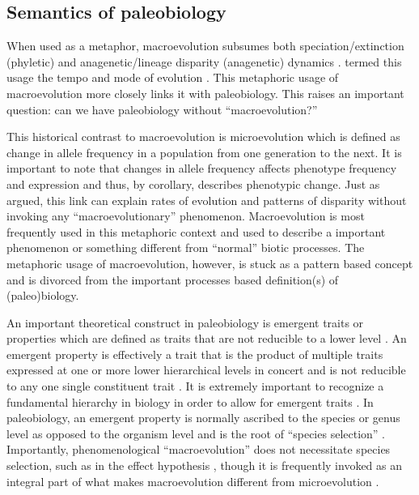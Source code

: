 \documentclass[12pt,letterpaper]{article}
\begin{document}
\subsection{Semantics of paleobiology}
When used as a metaphor, macroevolution subsumes both speciation/extinction (phyletic) and anagenetic/lineage disparity (anagenetic) dynamics \citep{Foote2007b}. \citet{Simpson1944} termed this usage the tempo and mode of evolution \citep{Simpson1944}. This metaphoric usage of macroevolution more closely links it with paleobiology. This raises an important question: can we have paleobiology without ``macroevolution?''

This historical contrast to macroevolution is microevolution \citep{Simpson1944,Foote2007b} which is defined as change in allele frequency in a population from one generation to the next. It is important to note that changes in allele frequency affects phenotype frequency and expression and thus, by corollary, describes phenotypic change. Just as \citet{Simpson1944} argued, this link can explain rates of evolution and patterns of disparity without invoking any ``macroevolutionary'' phenomenon. Macroevolution is most frequently used in this metaphoric context and used to describe a important phenomenon or something different from ``normal'' biotic processes. The metaphoric usage of macroevolution, however, is stuck as a pattern based concept and is divorced from the important processes based definition(s) of (paleo)biology. 

An important theoretical construct in paleobiology is emergent traits or properties which are defined as traits that are not reducible to a lower level \citep{Grantham1995,Vrba1984,Jablonski2008a,Lloyd1993}. An emergent property is effectively a trait that is the product of multiple traits expressed at one or more lower hierarchical levels in concert and is not reducible to any one single constituent trait \citep{Vrba1984,Jablonski2008a}. It is extremely important to recognize a fundamental hierarchy in biology in order to allow for emergent traits \citep{Vrba1984}. In paleobiology, an emergent property is normally ascribed to the species or genus level as opposed to the organism level and is the root of ``species selection'' \citep{Jablonski2008a,Vrba1984,Lloyd1993,Grantham1995}. Importantly, phenomenological ``macroevolution'' does not necessitate species selection, such as in the effect hypothesis \citep{Vrba1983,Jablonski2008a,Kitchell1985a}, though it is frequently invoked as an integral part of what makes macroevolution different from microevolution \citep{Grantham1995,Jablonski2008}.
\end{document}
